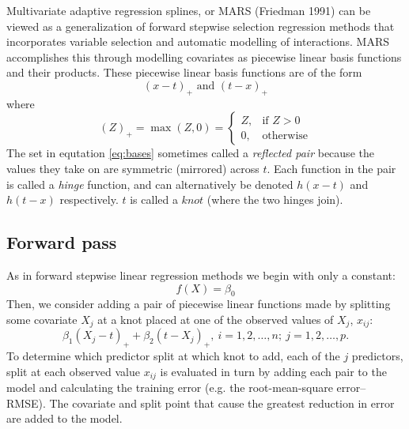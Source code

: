 \documentclass[12pt]{article}
\begin{document}
Multivariate adaptive regression splines, or MARS (Friedman 1991) can be viewed as a generalization of forward stepwise selection regression methods that incorporates variable selection and automatic modelling of interactions. MARS accomplishes this through modelling covariates as piecewise linear basis functions and their products.
These piecewise linear basis functions are of the form 
%
\begin{equation} \label{eq:bases}
  (x - t)_{+} \text{ and } (t - x)_{+}
\end{equation} where
%
\begin{equation}
  (Z)_{+} = \max(Z, 0) = \begin{cases}
  Z, & \text{if } Z > 0 \\
  0, & \text{otherwise}
  \end{cases}
\end{equation}
The set in equtation \ref{eq:bases} sometimes called a \emph{reflected pair} because the values they take on are symmetric (mirrored) across $t$. Each function in the pair is called a \emph{hinge} function, and can alternatively be denoted $h(x - t)$ and $h(t - x)$ respectively. $t$ is called a $knot$ (where the two hinges join).

\subsection{Forward pass} %
\label{sub:forward_pass}

As in forward stepwise linear regression methods we begin with only a constant:
\begin{equation}
  f(X) = \beta_{0}
\end{equation}
Then, we consider adding a pair of piecewise linear functions made by splitting some covariate $X_{j}$ at a knot placed at one of the observed values of $X_{j}$, $x_{ij}$:
\begin{equation}
\beta_{1} (X_{j} - t)_{+} + \beta_{2}(t - X_{j})_{+}, \ i = 1, 2, \ldots, n; \ j = 1, 2, \ldots, p.
\end{equation}
To determine which predictor split at which knot to add, each of the $j$ predictors, split at each observed value $x_{ij}$ is evaluated in turn by adding each pair to the model and calculating the training error (e.g. the root-mean-square error--RMSE). The covariate and split point that cause the greatest reduction in error are added to the model.
\end{document}

